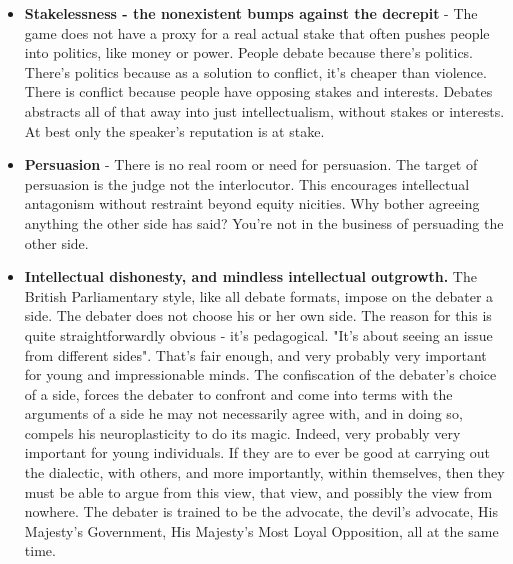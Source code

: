 \begin{itemize}
    Because adjudicators self-replicate through mentorship, feedback, and appointment to “breaking” panels, the ideological DNA of early community leaders becomes canon law. These norms propagate not via formal enforcement but prestige incentives (e.g. who gets to judge finals, give feedback, or train national teams).
    
    BP’s elite adjudicator pool has effectively ossified into a monoculture: university-educated, liberal-globalist, anti-discrimination, pro-minority, suspicious of religion, skeptical of nationalism, technocratic in outlook.

    As a result, there is no real judgement. There's only performativity.\footnote{
        It is probable that the same mechanism is responsible for the ideological capture of Common Law courts in various Common Law jurisdictions - Britain, Hong Kong, Singapore, and elsewhere. They're all 做大戲. The only exception is America, where court battles are still arguably genuine.

    }




    \item \textbf{Stakelessness - the nonexistent bumps against the decrepit} - The game does not have a proxy for a real actual stake that often pushes people into politics, like money or power. People debate because there's politics. There's politics because as a solution to conflict, it's cheaper than violence. There is conflict because people have opposing stakes and interests. Debates abstracts all of that away into just intellectualism, without stakes or interests. At best only the speaker's reputation is at stake.
    \item \textbf{Persuasion} - There is no real room or need for persuasion. The target of persuasion is the judge not the interlocutor. This encourages intellectual antagonism without restraint beyond equity nicities. Why bother agreeing anything the other side has said? You're not in the business of persuading the other side.
    \item \textbf{Intellectual dishonesty, and mindless intellectual outgrowth.} The British Parliamentary style, like all debate formats, impose on the debater a side. The debater does not choose his or her own side. The reason for this is quite straightforwardly obvious - it's pedagogical. "It's about seeing an issue from different sides". That's fair enough, and very probably very important for young and impressionable minds. The confiscation of the debater's choice of a side, forces the debater to confront and come into terms with the arguments of a side he may not necessarily agree with, and in doing so, compels his neuroplasticity to do its magic. Indeed, very probably very important for young individuals. If they are to ever be good at carrying out the dialectic, with others, and more importantly, within themselves, then they must be able to argue from this view, that view, and possibly the view from nowhere. The debater is trained to be the advocate, the devil's advocate, His Majesty's Government, His Majesty's Most Loyal Opposition, all at the same time.
    

\end{itemize}
